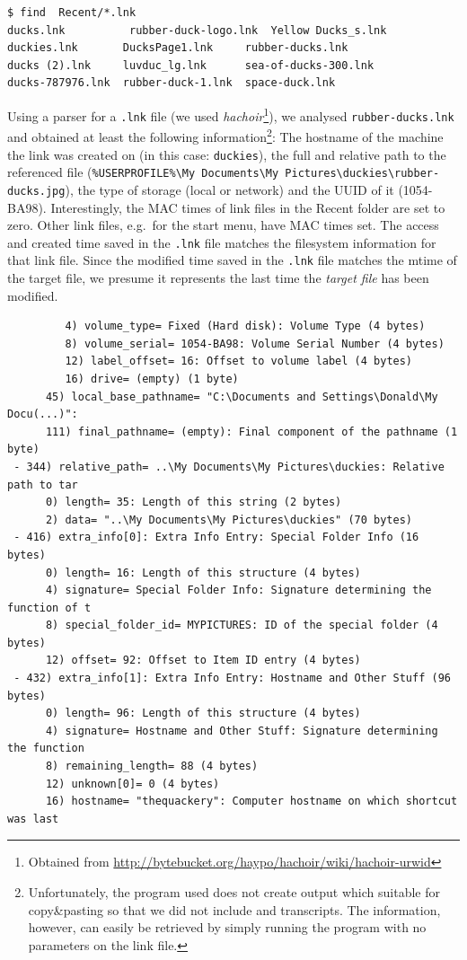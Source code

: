 \documentclass[a4paper,
    11pt,
    normalheadings,
    parindent,
    UKenglish,
    abstracton,
    ]{scrartcl}
\begin{document}
\begin{verbatim}
$ find  Recent/*.lnk
ducks.lnk          rubber-duck-logo.lnk  Yellow Ducks_s.lnk
duckies.lnk       DucksPage1.lnk     rubber-ducks.lnk
ducks (2).lnk     luvduc_lg.lnk      sea-of-ducks-300.lnk
ducks-787976.lnk  rubber-duck-1.lnk  space-duck.lnk
\end{verbatim}

Using a parser for a \texttt{.lnk} file (we used \emph{hachoir}\footnote{Obtained from \url{http://bytebucket.org/haypo/hachoir/wiki/hachoir-urwid}}), we analysed \texttt{rubber-ducks.lnk} and obtained at least the following information\footnote{Unfortunately, the program used does not create output which suitable for copy\&pasting so that we did not include and transcripts. The information, however, can easily be retrieved by simply running the program with no parameters on the link file.}:
The hostname of the machine the link was created on (in this case: \texttt{duckies}), the full and relative path to the referenced file (\texttt{\%USERPROFILE\%\textbackslash{}My Documents\textbackslash{}My Pictures\textbackslash{}duckies\textbackslash{}rubber-ducks.jpg}), the type of storage (local or network) and the UUID of it (1054-BA98).
Interestingly, the MAC times of link files in the Recent folder are set to zero.
Other link files, e.g.\, for the start menu, have MAC times set.
The access and created time saved in the \texttt{.lnk} file matches the filesystem information for that link file.
Since the modified time saved in the \texttt{.lnk} file matches the mtime of the target file, we presume it represents the last time the \emph{target file} has been modified.


\begin{verbatim}
         4) volume_type= Fixed (Hard disk): Volume Type (4 bytes)
         8) volume_serial= 1054-BA98: Volume Serial Number (4 bytes)
         12) label_offset= 16: Offset to volume label (4 bytes)
         16) drive= (empty) (1 byte)
      45) local_base_pathname= "C:\Documents and Settings\Donald\My Docu(...)":
      111) final_pathname= (empty): Final component of the pathname (1 byte)
 - 344) relative_path= ..\My Documents\My Pictures\duckies: Relative path to tar
      0) length= 35: Length of this string (2 bytes)
      2) data= "..\My Documents\My Pictures\duckies" (70 bytes)
 - 416) extra_info[0]: Extra Info Entry: Special Folder Info (16 bytes)
      0) length= 16: Length of this structure (4 bytes)
      4) signature= Special Folder Info: Signature determining the function of t
      8) special_folder_id= MYPICTURES: ID of the special folder (4 bytes)
      12) offset= 92: Offset to Item ID entry (4 bytes)
 - 432) extra_info[1]: Extra Info Entry: Hostname and Other Stuff (96 bytes)
      0) length= 96: Length of this structure (4 bytes)
      4) signature= Hostname and Other Stuff: Signature determining the function
      8) remaining_length= 88 (4 bytes)
      12) unknown[0]= 0 (4 bytes)
      16) hostname= "thequackery": Computer hostname on which shortcut was last
\end{verbatim}
\fi
\end{document}
